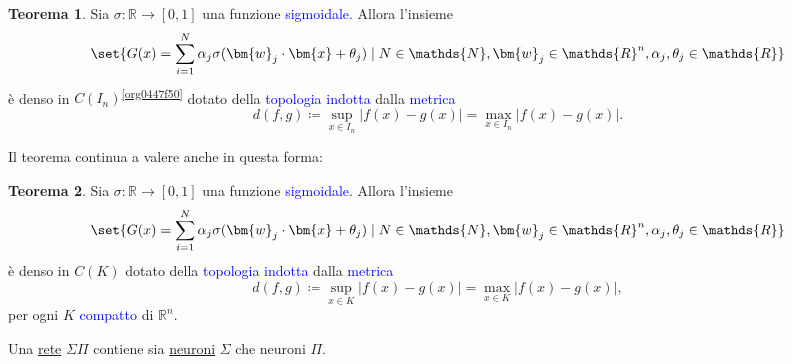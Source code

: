 \documentclass[10pt]{book}
\newcommand{\1}{\mathds{1}}
\newcommand{\R}{\mathds{R}}
\newcommand{\N}{\mathds{N}}
\theoremstyle{definition}%
\newtheorem{thm}{Teorema}[section]
\theoremstyle{plain}
\theoremstyle{remark}
\renewcommand{\href}[2]{\textcolor{blue}{#2}}
\begin{document}
\begin{thm}
Sia \(\sigma:\R\to [0,1]\) una funzione \href{../../../../../org/roam/20250625110110-funzione_sigmoidale.org}{sigmoidale}. Allora l'insieme
\begin{equation*}
\set{G(x) = \sum_{i =1}^{N}\alpha_{j}\sigma(\bm{w}_{j}\cdot \bm{x} + \theta_{j})\mid N \in \N, \bm{w}_{j} \in \R^{n}, \alpha_{j}, \theta_{j} \in \R}
\end{equation*}
è denso in \(C(I_{n})\)\textsuperscript{\ref{org0447f50}} dotato della \href{../../../../../org/roam/20250103145124-topologia.org}{topologia} \href{../../../../../org/roam/20250301193530-topologia_indotta_da_una_distanza.org}{indotta} dalla \href{../../../../../org/roam/20250301193511-spazio_metrico.org}{metrica}
\begin{equation*}
d(f,g) \coloneqq \sup_{x \in I_{n}} |f(x)-g(x)| = \max_{x \in I_{n}}|f(x)-g(x)|.
\end{equation*}
\label{teo9.3.6}
\end{thm}

Il teorema continua a valere anche in questa forma:
\begin{thm}
Sia \(\sigma:\R\to [0,1]\) una funzione \href{../../../../../org/roam/20250625110110-funzione_sigmoidale.org}{sigmoidale}. Allora l'insieme
\begin{equation*}
\set{G(x) = \sum_{i =1}^{N}\alpha_{j}\sigma(\bm{w}_{j}\cdot \bm{x} + \theta_{j})\mid N \in \N, \bm{w}_{j} \in \R^{n}, \alpha_{j}, \theta_{j} \in \R}
\end{equation*}
è denso in \(C(K)\) dotato della \href{../../../../../org/roam/20250103145124-topologia.org}{topologia} \href{../../../../../org/roam/20250301193530-topologia_indotta_da_una_distanza.org}{indotta} dalla \href{../../../../../org/roam/20250301193511-spazio_metrico.org}{metrica}
\begin{equation*}
d(f,g) \coloneqq \sup_{x \in K} |f(x)-g(x)| = \max_{x \in K}|f(x)-g(x)|,
\end{equation*}
per ogni \(K\) \href{../../../../../org/roam/20250103163701-spazio_topologico_compatto.org}{compatto} di \(\R^{n}\).
\end{thm}
Una \hyperref[sec:org599fe74]{rete} \(\Sigma\Pi\) contiene sia \hyperref[sec:org3b88f09]{neuroni} \(\Sigma\) che neuroni \(\Pi\).
\end{document}
